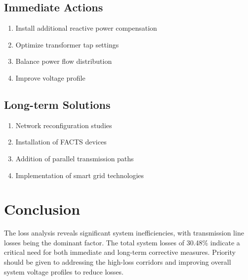 \documentclass[11pt]{article}
\begin{document}
\subsection{Immediate Actions}
\begin{enumerate}
    \item Install additional reactive power compensation
    \item Optimize transformer tap settings
    \item Balance power flow distribution
    \item Improve voltage profile
\end{enumerate}

\subsection{Long-term Solutions}
\begin{enumerate}
    \item Network reconfiguration studies
    \item Installation of FACTS devices
    \item Addition of parallel transmission paths
    \item Implementation of smart grid technologies
\end{enumerate}

\section{Conclusion}
The loss analysis reveals significant system inefficiencies, with transmission line losses being the dominant factor. The total system losses of 30.48\% indicate a critical need for both immediate and long-term corrective measures. Priority should be given to addressing the high-loss corridors and improving overall system voltage profiles to reduce losses.
\end{document}
